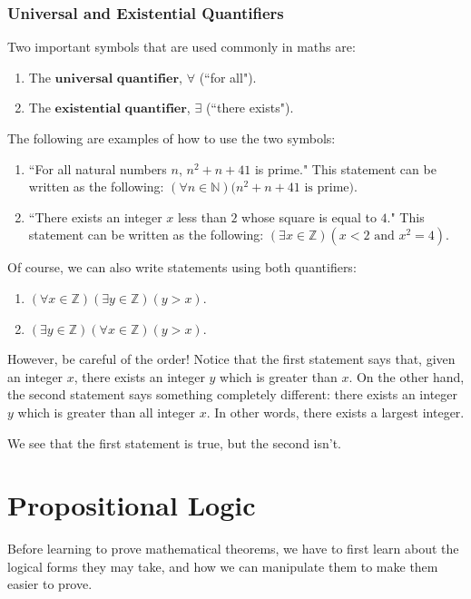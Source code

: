\documentclass[openany]{book}
\begin{document}
\subsubsection{Universal and Existential Quantifiers}
\begin{defn}[Quantifiers]
	Two important symbols that are used commonly in maths are:
	\begin{enumerate}
		\item The $\textbf{universal quantifier}$, $\forall$ (``for all").
		\item The $\textbf{existential quantifier}$, $\exists$ (``there exists").
	\end{enumerate}
\end{defn}

\begin{example}
	The following are examples of how to use the two symbols:
	\begin{enumerate}
		\item ``For all natural numbers $n$, $n^2+n+41$ is prime." This statement can be written as the following: $(\forall n\in\mathbb{N})(n^2+n+41 \text{ is prime)}$.
		\item ``There exists an integer $x$ less than $2$ whose square is equal to $4$." This statement can be written as the following: $(\exists x\in\mathbb{Z})(x<2 \text{ and } x^2=4)$.
	\end{enumerate}
\end{example}

Of course, we can also write statements using both quantifiers:
\begin{enumerate}
	\item $(\forall x\in\mathbb{Z})(\exists y\in\mathbb{Z})(y>x)$.
	\item $(\exists y\in\mathbb{Z})(\forall x \in\mathbb{Z})(y>x)$.
\end{enumerate}

However, be careful of the order! Notice that the first statement says that, given an integer $x$, there exists an integer $y$ which is greater than $x$. On the other hand, the second statement says something completely different: there exists an integer $y$ which is greater than all integer $x$. In other words, there exists a largest integer. 

We see that the first statement is true, but the second isn't.

\section{Propositional Logic} Before learning to prove mathematical theorems, we have to first learn about the logical forms they may take, and how we can manipulate them to make them easier to prove.
\end{document}
